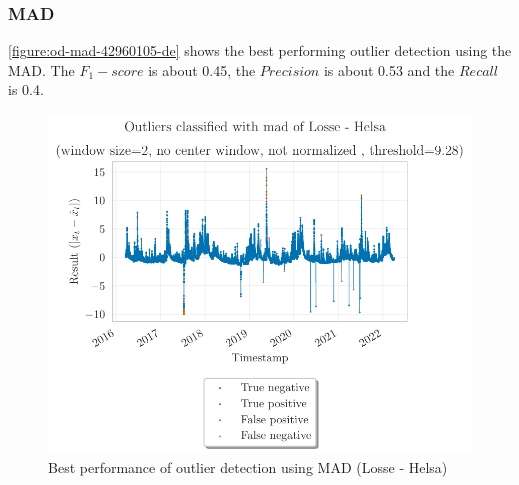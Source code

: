 \subsubsection{MAD}
\autoref{figure:od-mad-42960105-de} shows the best performing outlier detection using the \ac{MAD}. The $F_1-score$ is about 0.45, the $Precision$ is about 0.53 and the $Recall$ is 0.4. 
\begin{figure}[htp]
    \centering 
    \includegraphics{plots/pdfs/42960105-de/od_mad_42960105-de_all.pdf}
    \caption{Best performance of outlier detection using \ac{MAD} (Losse - Helsa)}
    \label{figure:od-mad-42960105-de}
\end{figure}

